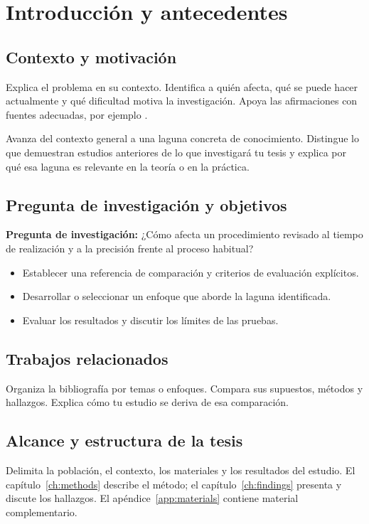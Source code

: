 \chapter{Introducción y antecedentes}
\label{ch:introduction}
\section{Contexto y motivación}
Explica el problema en su contexto. Identifica a quién afecta, qué se puede hacer
actualmente y qué dificultad motiva la investigación. Apoya las afirmaciones
con fuentes adecuadas, por ejemplo \cite{example}.

Avanza del contexto general a una laguna concreta de conocimiento. Distingue
lo que demuestran estudios anteriores de lo que investigará tu tesis y explica
por qué esa laguna es relevante en la teoría o en la práctica.
\section{Pregunta de investigación y objetivos}
\textbf{Pregunta de investigación:} ¿Cómo afecta un procedimiento revisado al tiempo
de realización y a la precisión frente al proceso habitual?
\begin{itemize}
\item Establecer una referencia de comparación y criterios de evaluación explícitos.
\item Desarrollar o seleccionar un enfoque que aborde la laguna identificada.
\item Evaluar los resultados y discutir los límites de las pruebas.
\end{itemize}
\section{Trabajos relacionados}
Organiza la bibliografía por temas o enfoques. Compara sus supuestos, métodos
y hallazgos. Explica cómo tu estudio se deriva de esa comparación.
\section{Alcance y estructura de la tesis}
Delimita la población, el contexto, los materiales y los resultados del estudio.
El capítulo~\ref{ch:methods} describe el método; el capítulo~\ref{ch:findings} presenta
y discute los hallazgos. El apéndice~\ref{app:materials} contiene material complementario.
